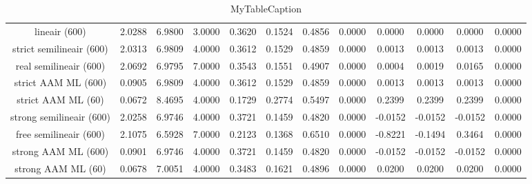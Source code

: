 \begin{table}
\centering
\begin{tabular}{|c|c|c|c|c|c|c|c|c|c|c|c|}
\hline
 &  &  &  &  &  &  &  &  &  &  &  \\
\hline
lineair (600) & 2.0288 & 6.9800 & 3.0000 & 0.3620 & 0.1524 & 0.4856 & 0.0000 & 0.0000 & 0.0000 & 0.0000 & 0.0000 \\
\hline
strict semilineair (600) & 2.0313 & 6.9809 & 4.0000 & 0.3612 & 0.1529 & 0.4859 & 0.0000 & 0.0013 & 0.0013 & 0.0013 & 0.0000 \\
\hline
real semilineair (600) & 2.0692 & 6.9795 & 7.0000 & 0.3543 & 0.1551 & 0.4907 & 0.0000 & 0.0004 & 0.0019 & 0.0165 & 0.0000 \\
\hline
strict AAM ML (600) & 0.0905 & 6.9809 & 4.0000 & 0.3612 & 0.1529 & 0.4859 & 0.0000 & 0.0013 & 0.0013 & 0.0013 & 0.0000 \\
\hline
strict AAM ML (60) & 0.0672 & 8.4695 & 4.0000 & 0.1729 & 0.2774 & 0.5497 & 0.0000 & 0.2399 & 0.2399 & 0.2399 & 0.0000 \\
\hline
strong semilineair (600) & 2.0258 & 6.9746 & 4.0000 & 0.3721 & 0.1459 & 0.4820 & 0.0000 & -0.0152 & -0.0152 & -0.0152 & 0.0000 \\
\hline
free semilineair (600) & 2.1075 & 6.5928 & 7.0000 & 0.2123 & 0.1368 & 0.6510 & 0.0000 & -0.8221 & -0.1494 & 0.3464 & 0.0000 \\
\hline
strong AAM ML (600) & 0.0901 & 6.9746 & 4.0000 & 0.3721 & 0.1459 & 0.4820 & 0.0000 & -0.0152 & -0.0152 & -0.0152 & 0.0000 \\
\hline
strong AAM ML (60) & 0.0678 & 7.0051 & 4.0000 & 0.3483 & 0.1621 & 0.4896 & 0.0000 & 0.0200 & 0.0200 & 0.0200 & 0.0000 \\
\hline
\end{tabular}
\caption{MyTableCaption}
\label{table:MyTableLabel}
\end{table}
